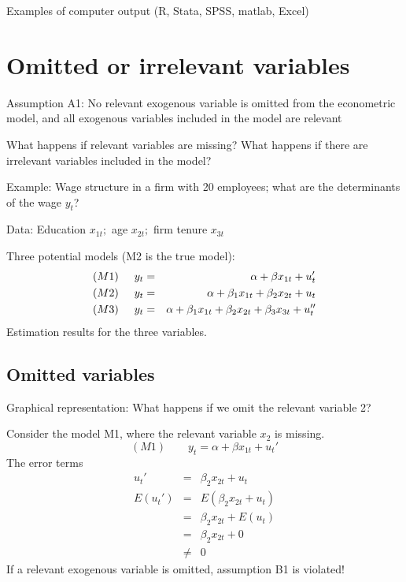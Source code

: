 \documentclass{article}
\begin{document}
Examples of computer output (R, Stata, SPSS, matlab, Excel)
\newpage

\section{Omitted or irrelevant variables}

Assumption A1: No relevant exogenous variable is omitted from the
econometric model, and all exogenous variables included in the model are
relevant

 What happens if relevant variables are missing? What happens if there are irrelevant variables included in the model?

Example: Wage structure in a firm with 20 employees; what are the
determinants of the wage $y_{t}$? 

Data: Education $x_{1t};$ age $x_{2t};$ firm tenure $x_{3t}$

Three potential models (M2 is the true model):
\begin{eqnarray*}
(M1)\hspace{0.5cm}y_{t} &=&\alpha +\beta x_{1t}+u_{t}' \\
(M2)\hspace{0.5cm}y_{t} &=&\alpha +\beta _{1}x_{1t}+\beta _{2}x_{2t}+u_{t}\\
(M3)\hspace{0.5cm}y_{t} &=&\alpha +\beta _{1}x_{1t}+\beta _{2}x_{2t}+\beta_{3}x_{3t}+u_{t}''
\end{eqnarray*}
Estimation results for the three variables.

\subsection*{Omitted variables}

Graphical representation: What happens if we omit the relevant variable 2?
\begin{center}

\end{center}

Consider the model M1, where the relevant variable $x_2$ is missing.
\[ (M1)\qquad y_{t} =\alpha +\beta x_{1t}+u_{t}' \]
The error terms
\begin{eqnarray*}
u_{t}' &=&\beta _{2}x_{2t}+u_{t} \\
E(u_{t}') &=&E(\beta _{2}x_{2t}+u_{t}) \\
&=&\beta _{2}x_{2t}+E(u_{t}) \\
&=&\beta _{2}x_{2t}+0 \\
&\neq &0
\end{eqnarray*}
If a relevant exogenous variable is omitted, assumption B1 is violated!
\end{document}
